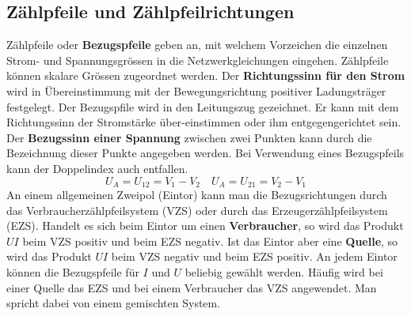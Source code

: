 \subsection{Zählpfeile und Zählpfeilrichtungen}
Zählpfeile oder \textbf{Bezugspfeile} geben an, mit welchem Vorzeichen die einzelnen Strom- und Spannungsgrössen in die Netzwerkgleichungen eingehen. Zählpfeile können skalare Grössen zugeordnet werden.
\newline\newline
Der \textbf{Richtungssinn für den Strom} wird in Übereinstimmung mit der Bewegungsrichtung positiver Ladungsträger festgelegt. Der Bezugspfile wird in den Leitungszug gezeichnet. Er kann mit dem Richtungssinn der Stromstärke über-einstimmen oder ihm entgegengerichtet sein.
\newline\newline
Der \textbf{Bezugssinn einer Spannung} zwischen zwei Punkten kann durch die Bezeichnung dieser Punkte angegeben werden. Bei Verwendung eines Bezugspfeils kann der Doppelindex auch entfallen.
\begin{equation}
\boxed{U_A=U_{12}=V_1-V_2}\quad \boxed{U_A=U_{21}=V_2-V_1}
\end{equation}
An einem allgemeinen Zweipol (Eintor) kann man die Bezugsrichtungen durch das Verbraucherzählpfeilsystem (VZS) oder durch das Erzeugerzählpfeilsystem (EZS).
\newline\newline
Handelt es sich beim Eintor um einen \textbf{Verbraucher}, so wird das Produkt $UI$ beim VZS positiv und beim EZS negativ. Ist das Eintor aber eine \textbf{Quelle}, so wird das Produkt $UI$ beim VZS negativ und beim EZS positiv.
\newline\newline
An jedem Eintor können die Bezugspfeile für $I$ und $U$ beliebig gewählt werden. Häufig wird bei einer Quelle das EZS und bei einem Verbraucher das VZS angewendet. Man spricht dabei von einem gemischten System.
